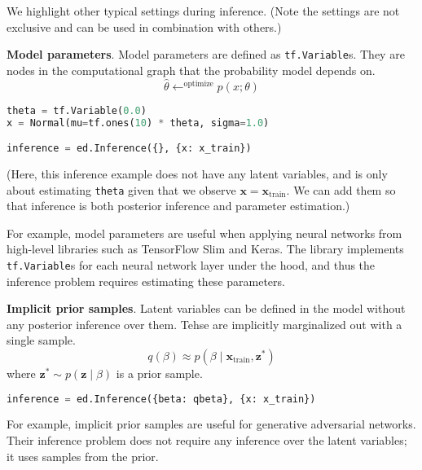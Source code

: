 We highlight other typical settings during inference. (Note the settings are not exclusive and can be used in combination with others.)

\textbf{Model parameters}.
Model parameters are defined as \texttt{tf.Variable}s. They are
nodes in the computational graph that the probability model
depends on.
\begin{equation*}
\hat{\theta} \leftarrow^{\text{optimize}}
p(x; \theta)
\end{equation*}

\begin{lstlisting}[language=Python]
theta = tf.Variable(0.0)
x = Normal(mu=tf.ones(10) * theta, sigma=1.0)

inference = ed.Inference({}, {x: x_train})
\end{lstlisting}
(Here, this inference example does not have any latent variables, and
is only about estimating \texttt{theta} given that we observe
$\mathbf{x} = \mathbf{x}_{\text{train}}$. We can add them so that
inference is both posterior inference and parameter estimation.)

For example, model parameters are useful when applying neural networks
from high-level libraries such as TensorFlow Slim and Keras. The library
implements \texttt{tf.Variable}s  for each neural network layer under
the hood, and thus the inference problem requires estimating these
parameters.

\textbf{Implicit prior samples}.
Latent variables can be defined in the model without any posterior
inference over them.
Tehse are implicitly marginalized out with a single sample.
\begin{equation*}
q(\beta)\approx
p(\beta\mid\mathbf{x}_{\text{train}}, \mathbf{z}^*)
\end{equation*}
where $\mathbf{z}^*\sim p(\mathbf{z}\mid\beta)$ is a prior sample.

\begin{lstlisting}[language=Python]
inference = ed.Inference({beta: qbeta}, {x: x_train})
\end{lstlisting}

For example, implicit prior samples are useful for generative adversarial
networks. Their inference problem does not require any inference over
the latent variables; it uses samples from the prior.
